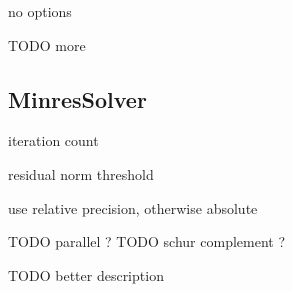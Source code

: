 no options 

TODO more

\subsection{MinresSolver}


iteration count


residual norm threshold


use relative precision, otherwise absolute


TODO parallel ?
TODO schur complement ?

TODO better description

